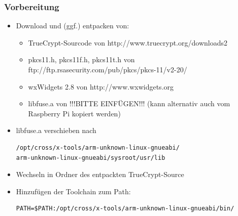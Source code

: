 \documentclass{beamer}
\begin{document}
\begin{frame}[fragile]
\frametitle{Vorbereitung}
\begin{itemize}
\item Download und (ggf.) entpacken von:
\begin{itemize}
\item TrueCrypt-Sourcode von http://www.truecrypt.org/downloads2
\item pkcs11.h, pkcs11f.h, pkcs11t.h von ftp://ftp.rsasecurity.com/pub/pkcs/pkcs-11/v2-20/
\item wxWidgets 2.8 von http://www.wxwidgets.org
\item libfuse.a von !!!BITTE EINFÜGEN!!! (kann alternativ auch vom Raspberry Pi kopiert werden)
\end{itemize}
\item libfuse.a verschieben nach
\begin{footnotesize}
\begin{verbatim}
/opt/cross/x-tools/arm-unknown-linux-gnueabi/
arm-unknown-linux-gnueabi/sysroot/usr/lib
\end{verbatim}
\end{footnotesize}
\item Wechseln in Ordner des entpackten TrueCrypt-Source
\item Hinzufügen der Toolchain zum Path: 
\begin{footnotesize}
\begin{verbatim}
PATH=$PATH:/opt/cross/x-tools/arm-unknown-linux-gnueabi/bin/
\end{verbatim}
\end{footnotesize}
\end{itemize}
\end{frame}
\end{document}
